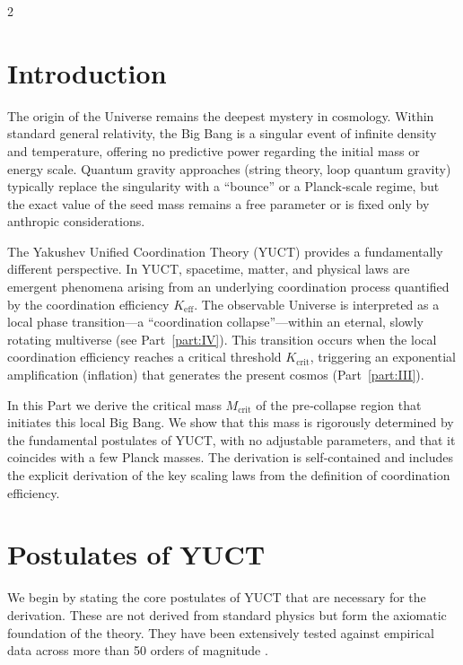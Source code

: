 \documentclass[12pt,a4paper]{article}
\begin{document}
	\begin{multicols}{2}
		
		\section{Introduction}
		
		The origin of the Universe remains the deepest mystery in cosmology. Within standard general relativity, the Big Bang is a singular event of infinite density and temperature, offering no predictive power regarding the initial mass or energy scale. Quantum gravity approaches (string theory, loop quantum gravity) typically replace the singularity with a “bounce” or a Planck‑scale regime, but the exact value of the seed mass remains a free parameter or is fixed only by anthropic considerations.
		
		The Yakushev Unified Coordination Theory (YUCT) provides a fundamentally different perspective. In YUCT, spacetime, matter, and physical laws are emergent phenomena arising from an underlying coordination process quantified by the coordination efficiency \(K_{\mathrm{eff}}\). The observable Universe is interpreted as a local phase transition—a “coordination collapse”—within an eternal, slowly rotating multiverse (see Part~\ref{part:IV}). This transition occurs when the local coordination efficiency reaches a critical threshold \(K_{\mathrm{crit}}\), triggering an exponential amplification (inflation) that generates the present cosmos (Part~\ref{part:III}).
		
		In this Part we derive the critical mass \(M_{\mathrm{crit}}\) of the pre‑collapse region that initiates this local Big Bang. We show that this mass is rigorously determined by the fundamental postulates of YUCT, with no adjustable parameters, and that it coincides with a few Planck masses. The derivation is self‑contained and includes the explicit derivation of the key scaling laws from the definition of coordination efficiency.
		
		\section{Postulates of YUCT}
		
		We begin by stating the core postulates of YUCT that are necessary for the derivation. These are not derived from standard physics but form the axiomatic foundation of the theory. They have been extensively tested against empirical data across more than 50 orders of magnitude \cite{AppendixL}.
		

\end{multicols}
\end{document}
